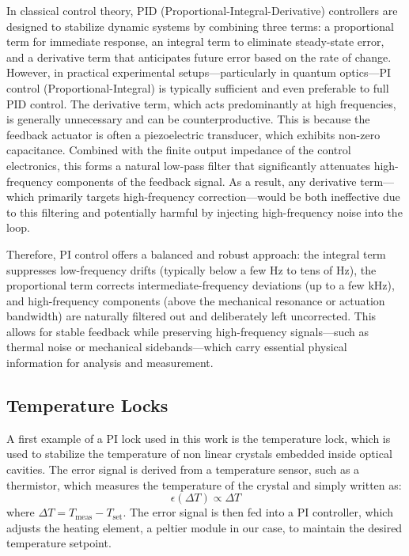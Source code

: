 \noindent In classical control theory, PID (Proportional-Integral-Derivative) controllers are designed to stabilize dynamic systems by combining three terms: a proportional term for immediate response, an integral term to eliminate steady-state error, and a derivative term that anticipates future error based on the rate of change. However, in practical experimental setups—particularly in quantum optics—PI control (Proportional-Integral) is typically sufficient and even preferable to full PID control. The derivative term, which acts predominantly at high frequencies, is generally unnecessary and can be counterproductive. This is because the feedback actuator is often a piezoelectric transducer, which exhibits non-zero capacitance. Combined with the finite output impedance of the control electronics, this forms a natural low-pass filter that significantly attenuates high-frequency components of the feedback signal. As a result, any derivative term—which primarily targets high-frequency correction—would be both ineffective due to this filtering and potentially harmful by injecting high-frequency noise into the loop. \newline 

\noindent Therefore, PI control offers a balanced and robust approach: the integral term suppresses low-frequency drifts (typically below a few Hz to tens of Hz), the proportional term corrects intermediate-frequency deviations (up to a few kHz), and high-frequency components (above the mechanical resonance or actuation bandwidth) are naturally filtered out and deliberately left uncorrected. This allows for stable feedback while preserving high-frequency signals—such as thermal noise or mechanical sidebands—which carry essential physical information for analysis and measurement.

\subsection{Temperature Locks}
A first example of a PI lock used in this work is the temperature lock, which is used to stabilize the temperature of non linear crystals embedded inside optical cavities. The error signal is derived from a temperature sensor, such as a thermistor, which measures the temperature of the crystal and simply written as:
\begin{equation}
\epsilon(\Delta T) \propto \Delta T 
\end{equation}
where \( \Delta T = T_{\text{meas}} - T_{\text{set}} \).
The error signal is then fed into a PI controller, which adjusts the heating element, a peltier module in our case, to maintain the desired temperature setpoint. \newline

